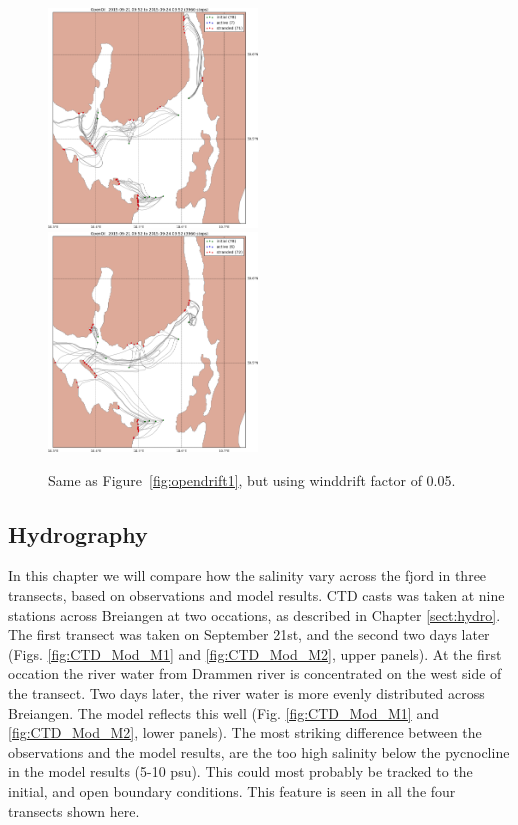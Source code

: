 \documentclass[12pt,a4paper,english]{article}
\begin{document}
\begin{figure}[ht]
\centerline{
\includegraphics*[width=0.495\textwidth]{Opendrift_simulations/LTR3/tokt_drifters_winddrift_0p5_radius_0_num_6_plusminus_2p5h_crop}
\includegraphics*[width=0.495\textwidth]{Opendrift_simulations/LTR3/tokt_drifters_winddrift_0p5_radius_0_num_6_plusminus_2p5h_norkyst_crop}
}
\caption{\small
Same as Figure~\ref{fig:opendrift1}, but using winddrift factor of 0.05.
}
\label{fig:opendrift4}
\end{figure}

\clearpage

\subsection{Hydrography}

In this chapter we will compare how the salinity vary across the fjord in three 
transects, based on observations and model results.
CTD casts was taken at nine stations across Breiangen at two occations, as described in Chapter \ref{sect:hydro}.
The first transect was taken on September 21st, and the second two days later 
(Figs. \ref{fig:CTD_Mod_M1} and \ref{fig:CTD_Mod_M2}, upper panels).
At the first occation the river water from Drammen river is concentrated on the 
west side of the transect.
Two days later, the river water is more evenly distributed across Breiangen.
The model reflects this well
(Fig. \ref{fig:CTD_Mod_M1} and \ref{fig:CTD_Mod_M2}, lower panels).
The most striking difference between the observations and the model results,
are the too high salinity below the pycnocline in the model results (5-10 psu).
This could most probably be tracked to the initial, and open boundary conditions.
This feature is seen in all the four transects shown here.
\end{document}
